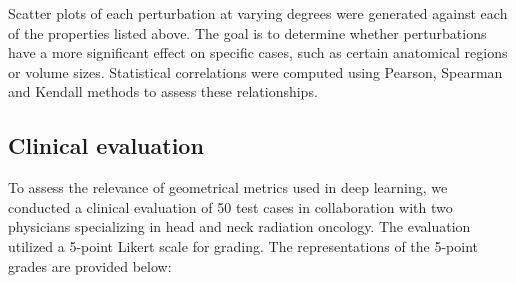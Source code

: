 Scatter plots of each perturbation at varying degrees were generated against each of the properties listed above. 
The goal is to determine whether perturbations have a more significant effect on specific cases, such as certain anatomical 
regions or volume sizes. Statistical correlations were computed using Pearson, Spearman and Kendall methods to assess 
these relationships.

\newpage
\subsection{Clinical evaluation}
To assess the relevance of geometrical metrics used in deep learning, we conducted a clinical evaluation of 50 test cases in collaboration with two 
physicians specializing in head and neck radiation oncology. The evaluation utilized a 5-point Likert scale for grading. 
The representations of the 5-point grades are provided below:


